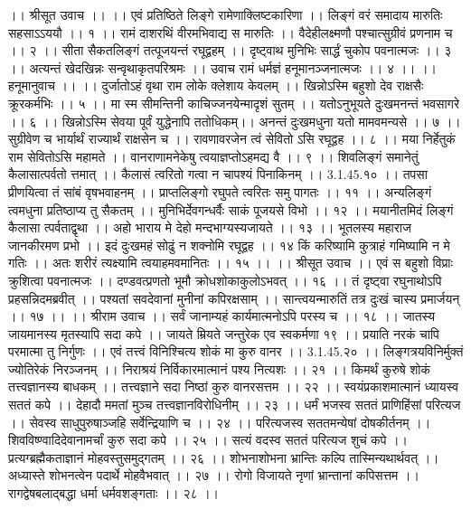 ।। श्रीसूत उवाच ।। ।।
एवं प्रतिष्ठिते लिङ्गे रामेणाक्लिष्टकारिणा ।।
लिङ्गं वरं समादाय मारुतिः सहसाऽऽययौ ।। १ ।।
रामं दाशरथिं वीरमभिवाद्य स मारुतिः ।।
वैदेहीलक्ष्मणौ पश्चात्सुग्रीवं प्रणनाम च ।। २ ।।
सीता सैकतलिङ्गं तत्पूजयन्तं रघूद्वहम् ।।
दृष्ट्वाथ मुनिभिः सार्द्धं चुकोप पवनात्मजः ।। ३ ।।
अत्यन्तं खेदखिन्नः सन्वृथाकृतपरिश्रमः ।।
उवाच रामं धर्मज्ञं हनूमानञ्जनात्मजः ।। ४ ।।
।। हनूमानुवाच ।। ।।
दुर्जातोऽहं वृथा राम लोके क्लेशाय केवलम् ।।
खिन्नोऽस्मि बहुशो देव राक्षसैः क्रूरकर्मभिः ।। ५ ।।
मा स्म सीमन्तिनी काचिज्जनयेन्मादृशं सुतम् ।।
यतोऽनुभूयते दुःखमनन्तं भवसागरे ।। ६ ।।
खिन्नोऽस्मि सेवया पूर्वं युद्धेनापि ततोधिकम्।।
अनन्तं दुःखमधुना यतो मामवमन्यसे ।। ७ ।।
सुग्रीवेण च भार्यार्थं राज्यार्थं राक्षसेन च ।।
रावणावरजेन त्वं सेवितो ऽसि रघूद्वह ।। ८ ।।
मया निर्हेतुकं राम सेवितोऽसि महामते ।।
वानराणामनेकेषु त्वयाज्ञप्तोऽहमद्य वै ।। ९ ।।
शिवलिङ्गं समानेतुं कैलासात्पर्वतो त्तमात् ।।
कैलासं त्वरितो गत्वा न चापश्यं पिनाकिनम् ।। 3.1.45.१० ।।
तपसा प्रीणयित्वा तं सांबं वृषभवाहनम् ।।
प्राप्तलिङ्गो रघुपते त्वरितः समु पागतः ।। ११ ।।
अन्यलिङ्गं त्वमधुना प्रतिष्ठाप्य तु सैकतम् ।।
मुनिभिर्देवगन्धर्वैः साकं पूजयसे विभो ।। १२ ।।
मयानीतमिदं लिङ्गं कैलासा त्पर्वताद्वृथा ।।
अहो भाराय मे देहो मन्दभाग्यस्यजायते ।। १३ ।।
भूतलस्य महाराज जानकीरमण प्रभो ।।
इदं दुःखमहं सोढुं न शक्नोमि रघूद्वह ।। १४
किं करिष्यामि कुत्राहं गमिष्यामि न मे गतिः ।।
अतः शरीरं त्यक्ष्यामि त्वयाहमवमानितः ।। १५ ।।
।। श्रीसूत उवाच ।।
एवं स बहुशो विप्राः क्रुशित्वा पवनात्मजः ।।
दण्डवत्प्रणतो भूमौ क्रोधशोकाकुलोऽभवत् ।। १६ ।।
तं दृष्ट्वा रघुनाथोऽपि प्रहसन्निदमब्रवीत् ।।
पश्यतां सवदेवानां मुनीनां कपिरक्षसाम् ।।
सान्त्वयन्मारुतिं तत्र दुःखं चास्य प्रमार्जयन् ।। १७ ।।
।। श्रीराम उवाच ।।
सर्वं जानाम्यहं कार्यमात्मनोऽपि परस्य च ।। १८ ।।
जातस्य जायमानस्य मृतस्यापि सदा कपे ।।
जायते म्रियते जन्तुरेक एव स्वकर्मणा १९ ।।
प्रयाति नरकं चापि परमात्मा तु निर्गुणः ।।
एवं तत्त्वं विनिश्चित्य शोकं मा कुरु वानर ।। 3.1.45.२० ।।
लिङ्गत्रयविनिर्मुक्तं ज्योतिरेकं निरञ्जनम् ।।
निराश्रयं निर्विकारमात्मानं पश्य नित्यशः ।। २१ ।।
किमर्थं कुरुषे शोकं तत्त्वज्ञानस्य बाधकम् ।।
तत्त्वज्ञाने सदा निष्ठां कुरु वानरसत्तम ।। २२ ।।
स्वयंप्रकाशमात्मानं ध्यायस्व सततं कपे ।।
देहादौ ममतां मुञ्च तत्त्वज्ञानविरोधिनीम् ।। २३ ।।
धर्मं भजस्व सततं प्राणिहिंसां परित्यज ।।
सेवस्व साधुपुरुषाञ्जहि सर्वेन्द्रियाणि च ।। २४ ।।
परित्यजस्व सततमन्येषां दोषकीर्तनम् ।।
शिवविष्ण्वादिदेवानामर्चां कुरु सदा कपे ।। २५ ।।
सत्यं वदस्व सततं परित्यज शुचं कपे ।।
प्रत्यग्ब्रह्मैकताज्ञानं मोहवस्तुसमुद्गतम् ।। २६ ।।
शोभनाशोभना भ्रान्तिः कल्पि तास्मिन्यथार्थवत् ।।
अध्यास्ते शोभनत्वेन पदार्थे मोहवैभवात् ।। २७ ।।
रोगो विजायते नृणां भ्रान्तानां कपिसत्तम ।।
रागद्वेषबलाद्बद्धा धर्मा धर्मवशङ्गताः ।। २८ ।।
